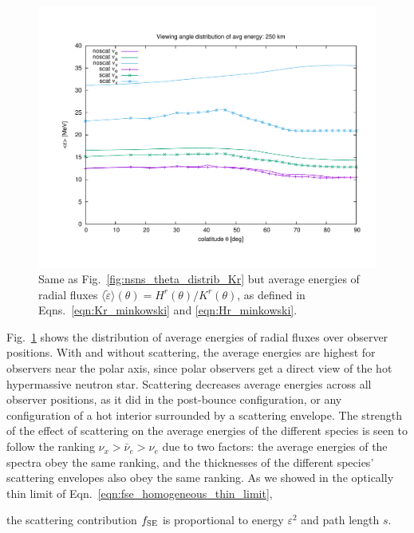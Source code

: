 \documentclass[aps,floatfix,prd,superscriptaddress,twocolumn]{revtex4-1}
\newcommand{\todo}[1]{\marginpar{\tiny{\textcolor{red}{#1}}}}
\renewcommand\todo[1]{} %
\begin{document}
\begin{figure}
  \includegraphics[width=\columnwidth]{theta_distrib-250km-avg_eps}
  \caption{Same as Fig.~\ref{fig:nsns_theta_distrib_Kr} but
    average energies of radial fluxes
    $\langle\tilde{\varepsilon}\rangle(\theta)=H^r(\theta)/K^r(\theta)$,
    as defined in Eqns.~\ref{eqn:Kr_minkowski} and \ref{eqn:Hr_minkowski}.
  }
  \label{fig:nsns_theta_distrib_avg_eps}
\end{figure}

Fig.~\ref{fig:nsns_theta_distrib_avg_eps} shows the distribution of
average energies of radial fluxes over observer positions.
With and without scattering, the average energies are highest
for observers near the polar axis, since polar observers get a
direct view of the hot hypermassive neutron star.
Scattering decreases average energies across all observer positions,
as it did in the post-bounce configuration, or any configuration of
a hot interior surrounded by a scattering envelope.
The strength of the effect of scattering on the average energies of
the different species is seen to follow the ranking
$\nu_x>\bar{\nu}_e>\nu_e$ due to two factors:
the average energies of the spectra obey the same ranking,
and the thicknesses of the different species' scattering envelopes
also obey the same ranking.
As we showed in the optically thin limit of
Eqn.~\ref{eqn:fse_homogeneous_thin_limit},
\todo{too simplistic}
the scattering contribution $f_{\rm SE}$ is
proportional to energy $\varepsilon^2$ and path length $s$.
\end{document}
